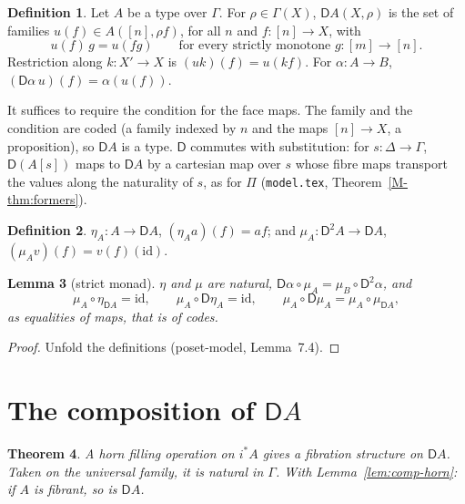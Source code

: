 \documentclass[11pt]{article}
\newcommand{\id}{\mathrm{id}}
\newcommand{\D}{\mathsf{D}}
\theoremstyle{plain}
\newtheorem{theorem}{Theorem}[section]
\newtheorem{lemma}[theorem]{Lemma}
\theoremstyle{definition}
\newtheorem{definition}[theorem]{Definition}
\theoremstyle{remark}
\begin{document}
\begin{definition}
Let $A$ be a type over $\Gamma$. For $\rho\in\Gamma(X)$, $\D A(X,\rho)$ is the
set of families $u(f)\in A([n],\rho f)$, for all $n$ and $f:[n]\to X$, with
\[
u(f)\,g=u(fg)\qquad\text{for every strictly monotone } g:[m]\to[n].
\]
Restriction along $k:X'\to X$ is $(uk)(f)=u(kf)$. For $\alpha:A\to B$,
$(\D\alpha\,u)(f)=\alpha(u(f))$.
\end{definition}

It suffices to require the condition for the face maps. The family and the
condition are coded (a family indexed by $n$ and the maps $[n]\to X$, a
proposition), so $\D A$ is a type. $\D$ commutes with substitution: for
$s:\Delta\to\Gamma$, $\D(A[s])$ maps to $\D A$ by a cartesian map over $s$
whose fibre maps transport the values along the naturality of $s$, as for
$\Pi$ (\texttt{model.tex}, Theorem~\ref{M-thm:formers}).

\begin{definition}
$\eta_A:A\to\D A$, $(\eta_A a)(f)=af$; and $\mu_A:\D^2A\to\D A$,
$(\mu_A v)(f)=v(f)(\id)$.
\end{definition}

\begin{lemma}[strict monad]\label{lem:monad}
$\eta$ and $\mu$ are natural, $\D\alpha\circ\mu_A=\mu_B\circ\D^2\alpha$, and
\[
\mu_A\circ\eta_{\D A}=\id,\qquad \mu_A\circ\D\eta_A=\id,\qquad
\mu_A\circ\D\mu_A=\mu_A\circ\mu_{\D A},
\]
as equalities of maps, that is of codes.
\end{lemma}

\begin{proof}
Unfold the definitions (poset-model, Lemma~7.4).
\end{proof}

\section{The composition of $\D A$}\label{sec:comp}

\begin{theorem}\label{thm:DA}
A horn filling operation on $i^*A$ gives a fibration structure on $\D A$.
Taken on the universal family, it is natural in $\Gamma$. With Lemma~\ref{lem:comp-horn}: if $A$ is fibrant, so is
$\D A$.
\end{theorem}
\end{document}
